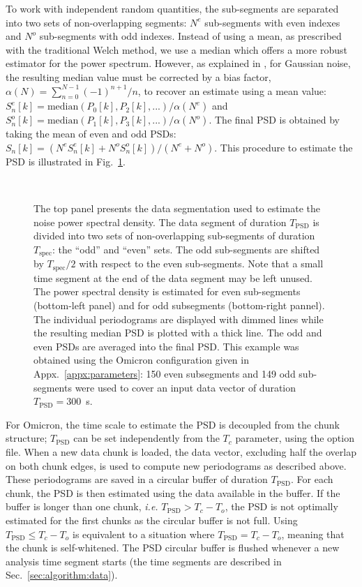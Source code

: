 To work with independent random quantities, the sub-segments are separated into two sets of non-overlapping segments: $N^e$ sub-segments with even indexes and $N^o$ sub-segments with odd indexes. Instead of using a mean, as prescribed with the traditional Welch method, we use a median which offers a more robust estimator for the power spectrum. However, as explained in \cite{Allen:2005fk}, for Gaussian noise, the resulting median value must be corrected by a bias factor, $\alpha(N)=\sum_{n=0}^{N-1}{(-1)^{n+1}/n}$, to recover an estimate using a mean value: $S_n^e[k]=\mathrm{median}(P_0[k], P_2[k],...)/\alpha(N^e)$ and $S_n^o[k]=\mathrm{median}(P_1[k], P_3[k],...)/\alpha(N^o)$. The final PSD is obtained by taking the mean of even and odd PSDs: $S_n[k]=(N^eS_n^e[k]+N^oS_n^o[k])/(N^e+N^o)$. This procedure to estimate the PSD is illustrated in Fig.~\ref{fig:psdseg}.
\begin{figure}
  \center
   \\
  \caption{The top panel presents the data segmentation used to estimate the noise power spectral density. The data segment of duration $T_\mathrm{PSD}$ is divided into two sets of non-overlapping sub-segments of duration $T_\mathrm{spec}$: the ``odd'' and ``even'' sets. The odd sub-segments are shifted by $T_\mathrm{spec}/2$ with respect to the even sub-segments. Note that a small time segment at the end of the data segment may be left unused. The power spectral density is estimated for even sub-segments (bottom-left panel) and for odd subsegments (bottom-right pannel). The individual periodograms are displayed with dimmed lines while the resulting median PSD is plotted with a thick line. The odd and even PSDs are averaged into the final PSD. This example was obtained using the Omicron configuration given in Appx.~\ref{appx:parameters}: 150 even subsegments and 149 odd sub-segments were used to cover an input data vector of duration $T_\mathrm{PSD}=300$~s.}
  \label{fig:psdseg}
\end{figure}

For Omicron, the time scale to estimate the PSD is decoupled from the chunk structure; $T_\mathrm{PSD}$ can be set independently from the $T_c$ parameter, using the option file. When a new data chunk is loaded, the data vector, excluding half the overlap on both chunk edges, is used to compute new periodograms as described above. These periodograms are saved in a circular buffer of duration $T_\mathrm{PSD}$. For each chunk, the PSD is then estimated using the data available in the buffer. If the buffer is longer than one chunk, \textit{i.e.} $T_\mathrm{PSD} > T_c-T_o$, the PSD is not optimally estimated for the first chunks as the circular buffer is not full. Using $T_\mathrm{PSD} \le T_c-T_o$ is equivalent to a situation where $T_\mathrm{PSD} = T_c-T_o$, meaning that the chunk is self-whitened. The PSD circular buffer is flushed whenever a new analysis time segment starts (the time segments are described in Sec.~\ref{sec:algorithm:data}). 

